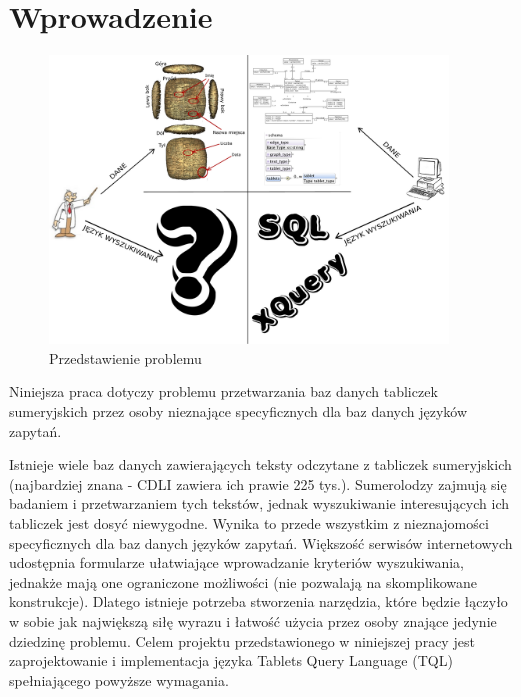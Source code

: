 \chapter*{Wprowadzenie}
\begin{figure}[h]
 \centering
 \includegraphics[width=400px]{../diagramy/poco.pdf}
 \caption{Przedstawienie problemu}
 \label{fig:poco}
\end{figure}

 
 
Niniejsza praca dotyczy problemu przetwarzania baz danych tabliczek sumeryjskich przez osoby nieznające specyficznych dla baz danych języków zapytań.


Istnieje wiele baz danych zawierających teksty odczytane z tabliczek sumeryjskich (najbardziej znana - CDLI zawiera ich prawie 225 tys.). Sumerolodzy zajmują się badaniem i przetwarzaniem tych tekstów, jednak wyszukiwanie interesujących ich tabliczek jest dosyć niewygodne. Wynika to przede wszystkim z nieznajomości specyficznych dla baz danych języków zapytań. 
Większość serwisów internetowych udostępnia formularze ułatwiające wprowadzanie kryteriów wyszukiwania, jednakże mają one ograniczone możliwości (nie pozwalają na skomplikowane konstrukcje). Dlatego istnieje potrzeba stworzenia narzędzia, które będzie łączyło w sobie jak największą siłę wyrazu i łatwość użycia przez osoby znające jedynie dziedzinę problemu. Celem projektu przedstawionego w niniejszej pracy jest zaprojektowanie i implementacja języka Tablets Query Language (TQL) spełniającego powyższe wymagania. 

